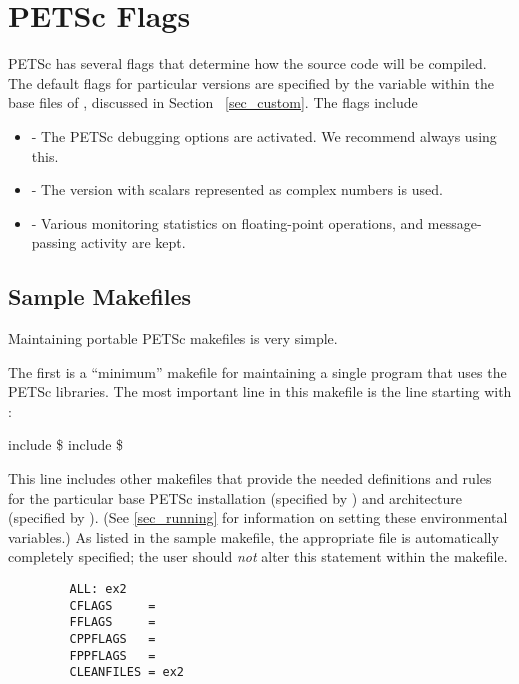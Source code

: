 {{\section{PETSc Flags}
\label{sec_makeflags}

PETSc has several flags that determine how the source code will be
compiled.  The default flags for particular versions are specified by
the variable  within the base files of , discussed in Section
~\ref{sec_custom}.  The flags include
\begin{itemize}
\item {} - The PETSc debugging options are activated. We
      recommend always using this. 
\item {} - The version with scalars represented
      as complex numbers is used. 
\item {} - Various monitoring statistics on floating-point operations,
      and message-passing activity are kept. 
\end{itemize}

\subsection{Sample Makefiles}

Maintaining portable PETSc makefiles is very simple.

The first is a ``minimum'' makefile for maintaining
a single program that uses the PETSc libraries.
The most important line in this makefile is the line starting with :
\begin{tabbing}
   include  \$
   include \$
\end{tabbing}
This line includes other makefiles that provide the needed definitions
and rules for the particular base PETSc installation (specified by
) and architecture (specified by
).  (See \ref{sec_running} for information on
setting these environmental variables.)  As listed in the sample
makefile, the appropriate  file is automatically
completely specified; the user should {\em not} alter this statement
within the makefile.

\begin{figure}[H]
{\small
\begin{verbatim}
   ALL: ex2
   CFLAGS     =
   FFLAGS     =
   CPPFLAGS   =
   FPPFLAGS   =
   CLEANFILES = ex2


\end{verbatim}}
\end{figure}}}
